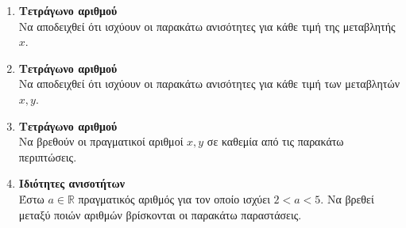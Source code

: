 \documentclass[twoside,nofonts,internet]{askhseis}
\begin{document}
\begin{enumerate}
\begin{rlist}
\item 
\item 
\item 
\end{rlist}
\item \textbf{Τετράγωνο αριθμού}\\
Να αποδειχθεί ότι ισχύουν οι παρακάτω ανισότητες για κάθε τιμή της μεταβλητής $ x $.
\begin{multicols}{2}
\end{multicols}
\item \textbf{Τετράγωνο αριθμού}\\
Να αποδειχθεί ότι ισχύουν οι παρακάτω ανισότητες για κάθε τιμή των μεταβλητών $ x,y $.
\begin{multicols}{2}
\end{multicols}
\vspace{-8mm}
\item \textbf{Τετράγωνο αριθμού}\\
Να βρεθούν οι πραγματικοί αριθμοί $ x,y $ σε καθεμία από τις παρακάτω περιπτώσεις.
\item \textbf{Ιδιότητες ανισοτήτων}\\
Έστω $ a\in\mathbb{R} $ πραγματικός αριθμός για τον οποίο ισχύει $ 2<a<5 $. Να βρεθεί μεταξύ ποιών αριθμών βρίσκονται οι παρακάτω παραστάσεις.

\end{enumerate}
\end{document}
